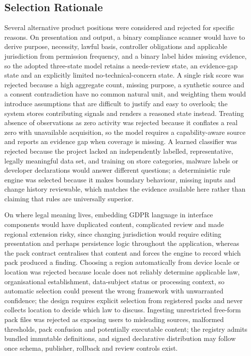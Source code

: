 \subsection{Selection Rationale}

Several alternative product positions were considered and rejected for specific reasons. On presentation and output, a binary compliance scanner would have to derive purpose, necessity, lawful basis, controller obligations and applicable jurisdiction from permission frequency, and a binary label hides missing evidence, so the adopted three-state model retains a needs-review state, an evidence-gap state and an explicitly limited no-technical-concern state. A single risk score was rejected because a high aggregate count, missing purpose, a synthetic source and a consent contradiction have no common natural unit, and weighting them would introduce assumptions that are difficult to justify and easy to overlook; the system stores contributing signals and renders a reasoned state instead. Treating absence of observations as zero activity was rejected because it conflates a real zero with unavailable acquisition, so the model requires a capability-aware source and reports an evidence gap when coverage is missing. A learned classifier was rejected because the project lacked an independently labelled, representative, legally meaningful data set, and training on store categories, malware labels or developer declarations would answer different questions; a deterministic rule engine was selected because it makes boundary behaviour, missing inputs and change history reviewable, which matches the evidence available here rather than claiming that rules are universally superior.

On where legal meaning lives, embedding GDPR language in interface components would have duplicated content, complicated review and made regional extension risky, since changing jurisdiction would require editing presentation and perhaps persistence logic throughout the application, whereas the pack contract centralises that content and forces the engine to record which pack produced a finding. Choosing a region automatically from device locale or location was rejected because locale does not reliably determine applicable law, organisational establishment, data-subject status or processing context, so automatic selection could present the wrong framework with unwarranted confidence; the design requires explicit selection from registered packs and never collects location to decide which law to discuss. Ingesting unrestricted free-form pack files was rejected as exposing users to misleading sources, malformed thresholds, pack confusion and potentially executable content; the registry admits bundled immutable definitions, and signed declarative distribution may follow once schema, publisher, rollback and review controls exist.

